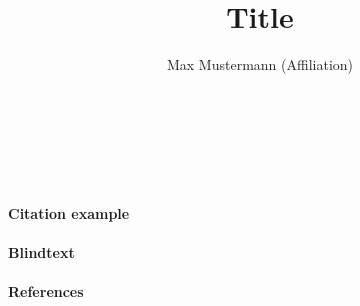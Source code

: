 \documentclass[
12pt,a4paper
]{article}
\author{Max Mustermann (Affiliation)}
\title{Title}
\makeatletter
\renewcommand\maketitle{
  ~\vspace{-1.1cm}\newline
  {\raggedright
    \renewcommand{\baselinestretch}{1.2}\selectfont
  {\bfseries\large\@title}\\[2ex]
  {\large\@author}
  }
}
\makeatother
\begin{document}
\maketitle

\paragraph{Citation example}



\paragraph{Blindtext} \lipsum

\paragraph{References}
{\tiny
\printbibliography[heading=none]
}
\end{document}
